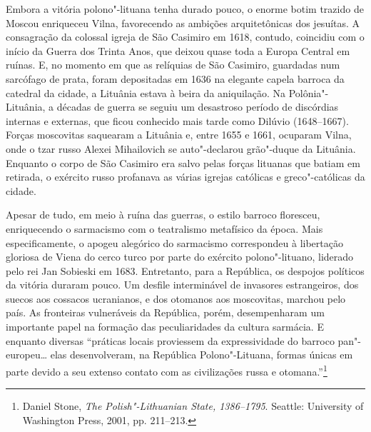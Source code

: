 Embora a vitória polono"-lituana tenha durado pouco, o enorme botim
trazido de Moscou enriqueceu Vilna, favorecendo as ambições
arquitetônicas dos jesuítas. A consagração da colossal igreja de São
Casimiro em 1618, contudo, coincidiu com o início da Guerra dos Trinta
Anos, que deixou quase toda a Europa Central em ruínas. E, no momento em
que as relíquias de São Casimiro, guardadas num sarcófago de prata,
foram depositadas em 1636 na elegante capela barroca da catedral da
cidade, a Lituânia estava à beira da aniquilação. Na Polônia"-Lituânia, a
décadas de guerra se seguiu um desastroso período de discórdias internas
e externas, que ficou conhecido mais tarde como Dilúvio (1648--1667).
Forças moscovitas saquearam a Lituânia e, entre 1655 e 1661, ocuparam
Vilna, onde o tzar russo Alexei Mihailovich se auto"-declarou grão"-duque
da Lituânia. Enquanto o corpo de São Casimiro era salvo pelas forças
lituanas que batiam em retirada, o exército russo profanava as várias
igrejas católicas e greco"-católicas da cidade.

%

Apesar de tudo, em meio à ruína das guerras, o estilo barroco floresceu,
enriquecendo o sarmacismo com o teatralismo metafísico da época. Mais
especificamente, o apogeu alegórico do sarmacismo correspondeu à
libertação gloriosa de Viena do cerco turco por parte do exército
polono"-lituano, liderado pelo rei Jan Sobieski em 1683. Entretanto, para
a República, os despojos políticos da vitória duraram pouco. Um desfile
interminável de invasores estrangeiros, dos suecos aos cossacos
ucranianos, e dos otomanos aos moscovitas, marchou pelo país. As
fronteiras vulneráveis da República, porém, desempenharam um importante
papel na formação das peculiaridades da cultura sarmácia. E enquanto
diversas ``práticas locais proviessem da expressividade do barroco
pan"-europeu\ldots{} elas desenvolveram, na República Polono"-Lituana,
formas únicas em parte devido a seu extenso contato com as civilizações
russa e otomana.''\footnote{Daniel Stone, \textit{The Polish"-Lithuanian State, 1386--1795}. Seattle: University of Washington Press, 2001, pp. 211--213.}
%

